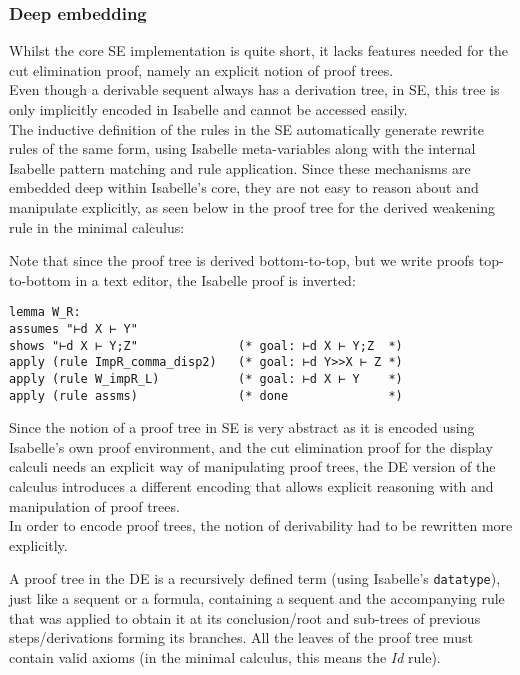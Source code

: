 \documentclass[]{article}
\begin{document}
\subsubsection{Deep embedding}\label{deep-embedding}

Whilst the core SE implementation is quite short, it lacks features
needed for the cut elimination proof, namely an explicit notion of proof
trees.\\ Even though a derivable sequent always has a derivation tree,
in SE, this tree is only implicitly encoded in Isabelle and cannot be
accessed easily.\\ The inductive definition of the rules in the SE
automatically generate rewrite rules of the same form, using Isabelle
meta-variables along with the internal Isabelle pattern matching and
rule application. Since these mechanisms are embedded deep within
Isabelle's core, they are not easy to reason about and manipulate
explicitly, as seen below in the proof tree for the derived weakening
rule in the minimal calculus:

Note that since the proof tree is derived bottom-to-top, but we write
proofs top-to-bottom in a text editor, the Isabelle proof is inverted:

\begin{verbatim}
lemma W_R: 
assumes "⊢d X ⊢ Y"
shows "⊢d X ⊢ Y;Z"              (* goal: ⊢d X ⊢ Y;Z  *)
apply (rule ImpR_comma_disp2)   (* goal: ⊢d Y>>X ⊢ Z *)
apply (rule W_impR_L)           (* goal: ⊢d X ⊢ Y    *)
apply (rule assms)              (* done              *)
\end{verbatim}

Since the notion of a proof tree in SE is very abstract as it is encoded
using Isabelle's own proof environment, and the cut elimination proof
for the display calculi needs an explicit way of manipulating proof
trees, the DE version of the calculus introduces a different encoding
that allows explicit reasoning with and manipulation of proof trees.\\
In order to encode proof trees, the notion of derivability had to be
rewritten more explicitly.

A proof tree in the DE is a recursively defined term (using Isabelle's
\texttt{datatype}), just like a sequent or a formula, containing a
sequent and the accompanying rule that was applied to obtain it at its
conclusion/root and sub-trees of previous steps/derivations forming its
branches. All the leaves of the proof tree must contain valid axioms (in
the minimal calculus, this means the \emph{Id} rule).
\end{document}
